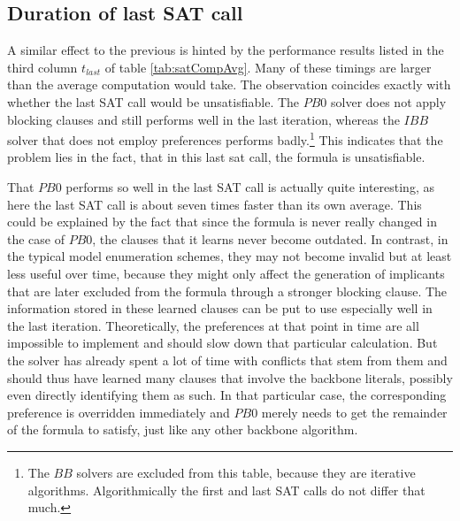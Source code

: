 



\subsection{Duration of last SAT call}
\label{ss:durLastCall}
A similar effect to the previous is hinted by the performance results listed in the third column $t_{last}$ of table \ref{tab:satCompAvg}. Many of these timings are larger than the average computation would take. The observation coincides exactly with whether the last SAT call would be unsatisfiable. The $PB0$ solver does not apply blocking clauses and still performs well in the last iteration, whereas the $IBB$ solver that does not employ preferences performs badly.\footnote{The $BB$ solvers are excluded from this table, because they are iterative algorithms. Algorithmically the first and last SAT calls do not differ that much.} This indicates that the problem lies in the fact, that in this last sat call, the formula is unsatisfiable.

That $PB0$ performs so well in the last SAT call is actually quite interesting, as here the last SAT call is about seven times faster than its own average. This could be explained by the fact that since the formula is never really changed in the case of $PB0$, the clauses that it learns never become outdated. In contrast, in the typical model enumeration schemes, they may not become invalid but at least less useful over time, because they might only affect the generation of implicants that are later excluded from the formula through a stronger blocking clause. The information stored in these learned clauses can be put to use especially well in the last iteration. Theoretically, the preferences at that point in time are all impossible to implement and should slow down that particular calculation. 
But the solver has already spent a lot of time with conflicts that stem from them and should thus have learned many clauses that involve the backbone literals, possibly even directly identifying them as such. In that particular case, the corresponding preference is overridden immediately and $PB0$ merely needs to get the remainder of the formula to satisfy, just like any other backbone algorithm.


